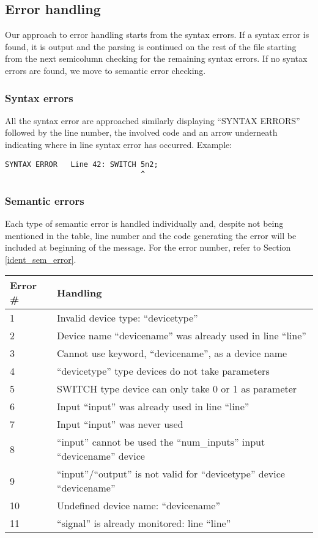 \documentclass[a4paper,11pt]{article}
\numberwithin{equation}{section}
\begin{document}
\subsection{Error handling}
Our approach to error handling starts from the syntax errors. If a syntax error is found, it is output and the parsing is continued on the rest of the file starting from the next semicolumn checking for the remaining syntax errors. If no syntax errors are found, we move to semantic error checking.
\subsubsection{Syntax errors}
All the syntax error are approached similarly displaying “SYNTAX ERRORS” followed by the line number, the involved code and an arrow underneath indicating where in line syntax error has occurred. Example:

\begin{lstlisting}
SYNTAX ERROR   Line 42: SWITCH 5n2;
                               ^
\end{lstlisting}
\subsubsection{Semantic errors}
Each type of semantic error is handled individually and, despite not being mentioned in the table, line number and the code generating the error will be included at beginning of the message. For the error number, refer to Section \ref{ident_sem_error}.

\begin{center}
	\begin{tabular}{l l}
		\hline
		\textbf{Error \#} & \textbf{Handling} \\ 
		\hline
		1 & Invalid device type: ``devicetype'' \\ 
		2 & Device name ``devicename'' was already used in line ``line''  \\ 
		3 & Cannot use keyword, ``devicename'', as a device name \\ 
		4 & ``devicetype'' type devices do not take parameters   \\ 
		5& SWITCH type device can only take 0 or 1 as parameter \\
		6 & Input ``input'' was already used in line “line”  \\
		7 & Input {``input''} was never used   \\
		8 & ``input'' cannot be used the ``num\_inputs'' input ``devicename'' device  \\
		9 & ``input''/``output'' is not valid for ``devicetype'' device ``devicename''   \\ 
		10 & Undefined device name:  ``devicename''  \\ 
		11 & ``signal'' is already monitored: line ``line'' \\
	\end{tabular}
	\label{bandwidth-efficiency}
\end{center}
\end{document}
